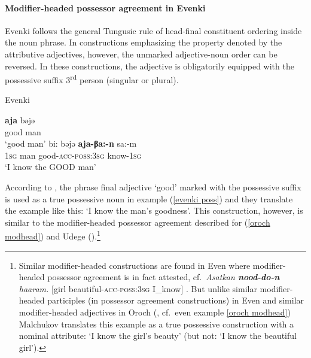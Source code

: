 \paragraph*{Modifier\hyp{}headed possessor agreement in Evenki}
Evenki follows the general Tungusic rule of head-final constituent ordering inside the noun phrase. In constructions emphasizing the property denoted by the attributive adjectives, however, the unmarked adjective-noun order can be reversed. In these constructions, the adjective is obligatorily equipped with the possessive suffix 3\textsuperscript{rd} person (singular or plural).
\begin{exe}
\ex 
\rm{Evenki \citep[18]{bulatova-etal1999}}
\begin{xlist}
\ex	
\gll	\textbf{aja} bəjə\\
	good man\\
\glt	‘good man’
\ex \label{evenki poss}
\gll	bi: bəjə \textbf{aja-βa:-n} sa:-m\\
	\textsc{1sg} man good-\textsc{acc}-\textsc{poss:3sg} know-\textsc{1sg}\\
\glt	‘I know the GOOD man’
\end{xlist}
\end{exe}
According to \citet[18]{bulatova-etal1999}, the phrase final adjective ‘good’ marked with the possessive suffix is used as a true possessive noun in example (\ref{evenki poss}) and they translate the example like this: ‘I know the man's goodness’. This construction, however, is similar to the modifier\hyp{}headed possessor agreement described for  (\ref{oroch modhead}) and Udege (\citealt[485, elsewhere]{nikolaeva-etal2001}).\footnote{Similar modifier\hyp{}headed constructions are found in Even where modifier\hyp{}headed possessor agreement is in fact attested, cf.~\textit{Asatkan \textbf{nood-do-n} haaram.} [girl beautiful-\textsc{acc}-\textsc{poss:3sg} I\_know] \citep[11]{malchukov1995}. But unlike similar modifier\hyp{}headed participles (in possessor agreement constructions) in Even \citep[31]{malchukov1995} and similar modifier\hyp{}headed adjectives in Oroch (\citealt{malchukov2000}, cf.~even example \ref{oroch modhead}) Malchukov translates this example as a true possessive construction with a nominal attribute: ‘I know the girl's beauty’ (but not: ‘I know the beautiful girl’).}

